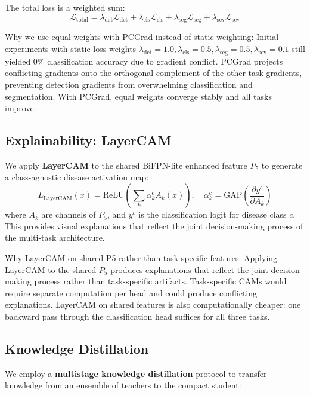 \documentclass[10pt,a4paper,twocolumn]{article}
\begin{document}
The total loss is a weighted sum:
\begin{equation}
\mathcal{L}_{\text{total}} = \lambda_{\text{det}} \mathcal{L}_{\text{det}} + \lambda_{\text{cls}} \mathcal{L}_{\text{cls}} + \lambda_{\text{seg}} \mathcal{L}_{\text{seg}} + \lambda_{\text{sev}} \mathcal{L}_{\text{sev}}
\end{equation}

Why we use equal weights with PCGrad instead of static weighting: Initial experiments with static loss weights $\lambda_{\text{det}}=1.0, \lambda_{\text{cls}}=0.5, \lambda_{\text{seg}}=0.5, \lambda_{\text{sev}}=0.1$ still yielded 0\% classification accuracy due to gradient conflict. PCGrad projects conflicting gradients onto the orthogonal complement of the other task gradients, preventing detection gradients from overwhelming classification and segmentation. With PCGrad, equal weights converge stably and all tasks improve.

\subsection{Explainability: LayerCAM}

We apply \textbf{LayerCAM} to the shared BiFPN-lite enhanced feature $P_5$ to generate a class-agnostic disease activation map:
\begin{equation}
L_{\text{LayerCAM}}(x) = \text{ReLU}\left( \sum_k \alpha_k^c A_k(x) \right), \quad \alpha_k^c = \text{GAP}\left( \frac{\partial y^c}{\partial A_k} \right)
\end{equation}
where $A_k$ are channels of $P_5$, and $y^c$ is the classification logit for disease class $c$. This provides visual explanations that reflect the joint decision-making process of the multi-task architecture.

Why LayerCAM on shared P5 rather than task-specific features: Applying LayerCAM to the shared $P_5$ produces explanations that reflect the joint decision-making process rather than task-specific artifacts. Task-specific CAMs would require separate computation per head and could produce conflicting explanations. LayerCAM on shared features is also computationally cheaper: one backward pass through the classification head suffices for all three tasks.

\subsection{Knowledge Distillation}

We employ a \textbf{multistage knowledge distillation} protocol to transfer knowledge from an ensemble of teachers to the compact student:
\end{document}
